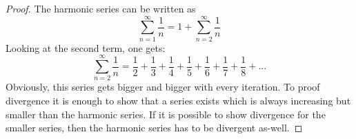 \begin{proof}
    The harmonic series can be written as
    \begin{equation}
        \sum_{n=1}^{\infty}\frac{1}{n} = 1 + \sum_{n=2}^{\infty}\frac{1}{n}
    \end{equation}
    Looking at the second term, one gets:
    \begin{equation}
        \sum_{n=2}^{\infty}\frac{1}{n} = 
            \frac{1}{2} + 
            \frac{1}{3} + \frac{1}{4} + 
            \frac{1}{5} + \frac{1}{6} + \frac{1}{7} + \frac{1}{8} + ...
    \end{equation}
    Obviously, this series gets bigger and bigger with every iteration.
    To proof divergence it is enough to show that a series exists which is always increasing 
    but smaller than the harmonic series.
    If it is possible to show divergence for the smaller series,
    then the harmonic series has to be divergent as-well.


\end{proof}
